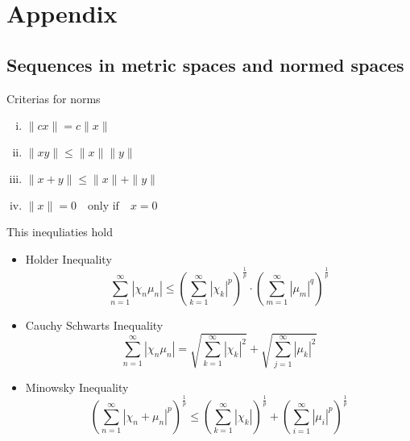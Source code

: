 \documentclass{article}
\theoremstyle{remark}
\begin{document}
\newpage
\section{Appendix}%
\label{sec:Notes}

\subsection{Sequences in metric spaces and normed spaces}%
\label{sub:sequences_in_metric_spaces_and_normed_spaces}

\begin{definition}[Norm]
  Criterias for norms
  \begin{enumerate}[(i)]
    \item $\|cx\| = c\|x\|$
    \item $\|xy\| \le \|x\| \|y\|$
    \item $\|x + y\| \le \|x\| +  \|y\|$
    \item $\|x\| = 0 \quad \text{only if} \quad x = 0 $ 
  \end{enumerate}

\end{definition}

\begin{theorem}[Inequalities]
  This inequliaties hold

    \item 
  \begin{itemize}
    \item Holder Inequality 
    \[
        \sum_{n=1}^{\infty} \left| \chi_{n} \mu_{n}  \right| \le \left( \sum_{k=1}^{\infty} \left| \chi_{k} \right|^{p} \right)^{\frac{1}{p}} \cdot \left( \sum_{m=1}^{\infty} \left| \mu_{m} \right|^{q} \right)^{\frac{1}{p}}  
      \] 
    \item Cauchy Schwarts Inequality   
      \[
        \sum_{n=1}^{\infty} \left| \chi_{n} \mu_{n} \right| = \sqrt{\sum_{k=1}^{\infty} \left| \chi_{k} \right|^{2}} + \sqrt{  \sum_{j=1}^{\infty} \left| \mu_{k} \right|^{2} }
      \] 
    \item Minowsky Inequality  
      \[
        \left( \sum_{n=1}^{\infty} \left| \chi_{n} + \mu_{n} \right|^{p} \right)^{\frac{1}{p}} \le \left( \sum_{k=1}^{\infty} \left| \chi_{k} \right| \right)^{\frac{1}{p}} + \left(   \sum_{i=1}^{\infty} \left| \mu_{i} \right|^{p} \right)^{\frac{1}{p}}
      \] 
  \end{itemize}

\end{theorem}
\end{document}
